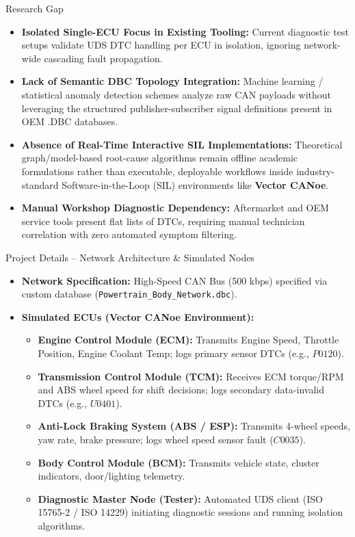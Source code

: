\documentclass[aspectratio=169, 10pt]{beamer}
\begin{document}
\begin{frame}{Research Gap}
  \begin{itemize}
    \item \textbf{Isolated Single-ECU Focus in Existing Tooling:} Current diagnostic test setups validate UDS DTC handling per ECU in isolation, ignoring network-wide cascading fault propagation.
    \item \textbf{Lack of Semantic DBC Topology Integration:} Machine learning / statistical anomaly detection schemes analyze raw CAN payloads without leveraging the structured publisher-subscriber signal definitions present in OEM .DBC databases.
    \item \textbf{Absence of Real-Time Interactive SIL Implementations:} Theoretical graph/model-based root-cause algorithms remain offline academic formulations rather than executable, deployable workflows inside industry-standard Software-in-the-Loop (SIL) environments like \textbf{Vector CANoe}.
    \item \textbf{Manual Workshop Diagnostic Dependency:} Aftermarket and OEM service tools present flat lists of DTCs, requiring manual technician correlation with zero automated symptom filtering.
  \end{itemize}
\end{frame}

\begin{frame}{Project Details -- Network Architecture \& Simulated Nodes}
  \begin{itemize}
    \item \textbf{Network Specification:} High-Speed CAN Bus (500 kbps) specified via custom database (\texttt{Powertrain\_Body\_Network.dbc}).
    \item \textbf{Simulated ECUs (Vector CANoe Environment):}
    \begin{itemize}
      \item \textbf{Engine Control Module (ECM):} Transmits Engine Speed, Throttle Position, Engine Coolant Temp; logs primary sensor DTCs (e.g., $P0120$).
      \item \textbf{Transmission Control Module (TCM):} Receives ECM torque/RPM and ABS wheel speed for shift decisions; logs secondary data-invalid DTCs (e.g., $U0401$).
      \item \textbf{Anti-Lock Braking System (ABS / ESP):} Transmits 4-wheel speeds, yaw rate, brake pressure; logs wheel speed sensor fault ($C0035$).
      \item \textbf{Body Control Module (BCM):} Transmits vehicle state, cluster indicators, door/lighting telemetry.
      \item \textbf{Diagnostic Master Node (Tester):} Automated UDS client (ISO 15765-2 / ISO 14229) initiating diagnostic sessions and running isolation algorithms.
    \end{itemize}
  \end{itemize}
\end{frame}
\end{document}
